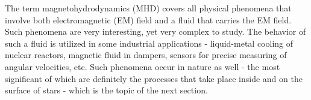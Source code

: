 The term magnetohydrodynamics (MHD) covers all physical phenomena that involve both electromagnetic (EM) field and a fluid that carries the EM field. Such phenomena are very interesting, yet very complex to study. The behavior of such a fluid is utilized in some industrial applications - liquid-metal cooling of nuclear reactors, magnetic fluid in dampers, sensors for precise measuring of angular velocities, etc. Such phenomena occur in nature as well - the most significant of which are definitely the processes that take place inside and on the surface of stars - which is the topic of the next section.